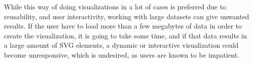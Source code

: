 \documentclass[Report.tex]{subfiles}
\begin{document}
	While this way of doing visualizations in a lot of cases is preferred due to reusability, and user interactivity, working with large datasets can give unwanted results. 
	If the user have to load more than a few megabytes of data in order to create the visualization, it is going to take some time, and if that data results in a large amount of SVG elements, a dynamic or interactive visualization could become unresponsive, which is undesired, as users are known to be impatient.
\end{document}
